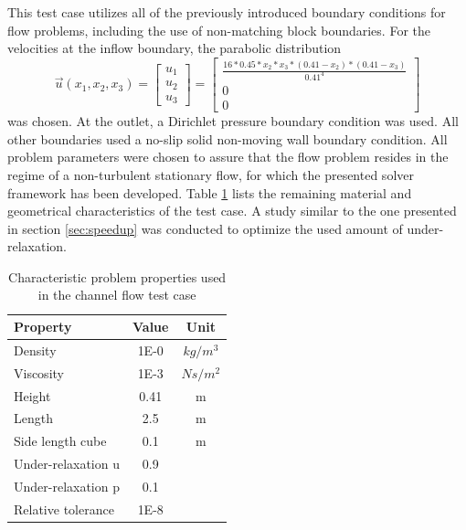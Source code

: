 This test case utilizes all of the previously introduced boundary conditions for flow problems, including the use of non-matching block boundaries. For the velocities at the inflow boundary, the parabolic distribution
\begin{displaymath}
  \vec{u}(x_1,x_2,x_3) 
  =
\left[
  \begin{array}{ccc}
    u_1 \\
    u_2 \\
    u_3 
  \end{array}
\right]
  =
\left[
  \begin{array}{ccc}
    \frac{ 16 * 0.45 * x_2 * x_3 * \left( 0.41 - x_2 \right) * \left( 0.41 - x_3 \right)}{0.41^4}
    \\[0.9em]
    0 \\[0.3em]
    0 
  \end{array}
\right]
\end{displaymath}
was chosen. At the outlet, a Dirichlet pressure boundary condition was used. All other boundaries used a no-slip solid non-moving wall boundary condition. All problem parameters were chosen to assure that the flow problem resides in the regime of a non-turbulent stationary flow, for which the presented solver framework has been developed. Table \ref{tab:channel} lists the remaining material and geometrical characteristics of the test case. A study similar to the one presented in section \ref{sec:speedup} was conducted to optimize the used amount of under-relaxation.

\begin{table}[h!]\centering
  \caption{Characteristic problem properties used in the channel flow test case}
  \begin{tabular}{lcc}\toprule
    Property & Value & Unit \\
    \midrule
    \rowcolor{tud0a} Density            & 1E-0 & $kg/m^3$  \\
    \rowcolor{black!00} Viscosity          & 1E-3 & $Ns/m^2$  \\
    \rowcolor{tud0a} Height             & 0.41 & m         \\
    \rowcolor{black!00} Length             & 2.5  & m         \\
    \rowcolor{tud0a} Side length cube   & 0.1  & m   \\
    \rowcolor{black!00} Under-relaxation u & 0.9  &    \\
    \rowcolor{tud0a} Under-relaxation p & 0.1  &    \\
    \rowcolor{black!00} Relative tolerance & 1E-8      &
  \end{tabular}
  \label{tab:channel}
\end{table}


